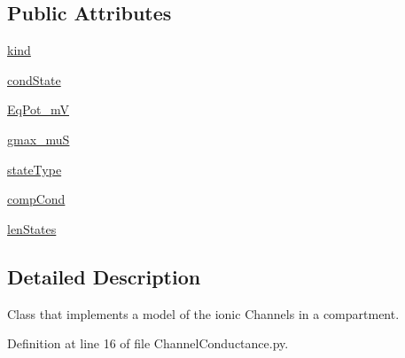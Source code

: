 \subsection*{Public Attributes}
\begin{DoxyCompactItemize}
\item 
\hyperlink{class_channel_conductance_1_1_channel_conductance_a7bf3e28aab2160014358cde589f2ec39}{kind}
\item 
\hyperlink{class_channel_conductance_1_1_channel_conductance_a628553cbc1efd93b30b0a15afd4417d9}{cond\-State}
\item 
\hyperlink{class_channel_conductance_1_1_channel_conductance_a654a73b6cd5853b509e7f7fba060572b}{Eq\-Pot\-\_\-m\-V}
\item 
\hyperlink{class_channel_conductance_1_1_channel_conductance_a80a0238a90b30b411c9381f682d0aeec}{gmax\-\_\-mu\-S}
\item 
\hyperlink{class_channel_conductance_1_1_channel_conductance_aa3c889bb4528c3abe7b69862cf87119d}{state\-Type}
\item 
\hyperlink{class_channel_conductance_1_1_channel_conductance_a0a91eec3fa2b1dfc66c6379943a5907f}{comp\-Cond}
\item 
\hyperlink{class_channel_conductance_1_1_channel_conductance_ae217799d13e5d225af048b7ba503fde1}{len\-States}
\end{DoxyCompactItemize}


\subsection{Detailed Description}
Class that implements a model of the ionic Channels in a compartment. 

Definition at line 16 of file Channel\-Conductance.\-py.



